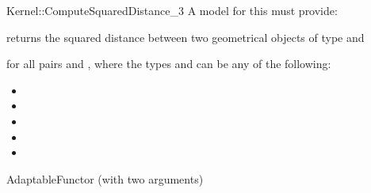 \begin{ccRefFunctionObjectConcept}{Kernel::ComputeSquaredDistance_3}
A model for this must provide:


{returns the squared distance between two geometrical objects of type
 and  }

for all pairs  and , where
the types  and  can be any of the
following:
\begin{itemize}
\item {}
\item {}
\item {}
\item {}
\item {}
\end{itemize}

\ccRefines
AdaptableFunctor (with two arguments)

\ccSeeAlso
{}  \\

\end{ccRefFunctionObjectConcept}
